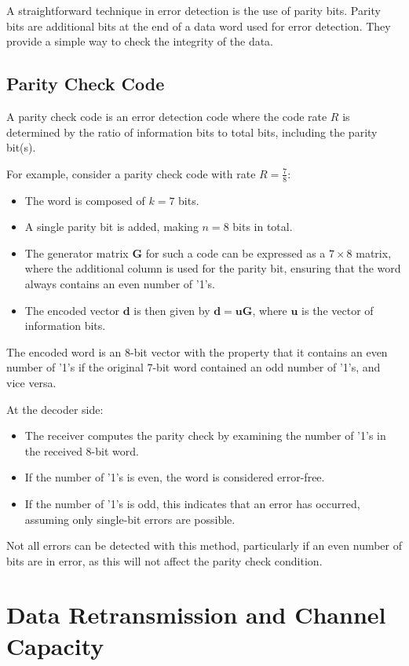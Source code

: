 A straightforward technique in error detection is the use of parity bits. Parity bits are additional bits at the end of a data word used for error detection. They provide a simple way to check the integrity of the data. 

\subsection*{Parity Check Code}
A parity check code is an error detection code where the code rate \( R \) is determined by the ratio of information bits to total bits, including the parity bit(s). 

For example, consider a parity check code with rate \( R = \frac{7}{8} \):
\begin{itemize}
    \item The word is composed of \( k = 7 \) bits.
    \item A single parity bit is added, making \( n = 8 \) bits in total.
    \item The generator matrix \( \mathbf{G} \) for such a code can be expressed as a \( 7 \times 8 \) matrix, where the additional column is used for the parity bit, ensuring that the word always contains an even number of '1's.
    \item The encoded vector \( \mathbf{d} \) is then given by \( \mathbf{d} = \mathbf{uG} \), where \( \mathbf{u} \) is the vector of information bits.
\end{itemize}

The encoded word is an 8-bit vector with the property that it contains an even number of '1's if the original 7-bit word contained an odd number of '1's, and vice versa.

At the decoder side:
\begin{itemize}
    \item The receiver computes the parity check by examining the number of '1's in the received 8-bit word.
    \item If the number of '1's is even, the word is considered error-free.
    \item If the number of '1's is odd, this indicates that an error has occurred, assuming only single-bit errors are possible.
\end{itemize}

Not all errors can be detected with this method, particularly if an even number of bits are in error, as this will not affect the parity check condition.


\section*{Data Retransmission and Channel Capacity}

